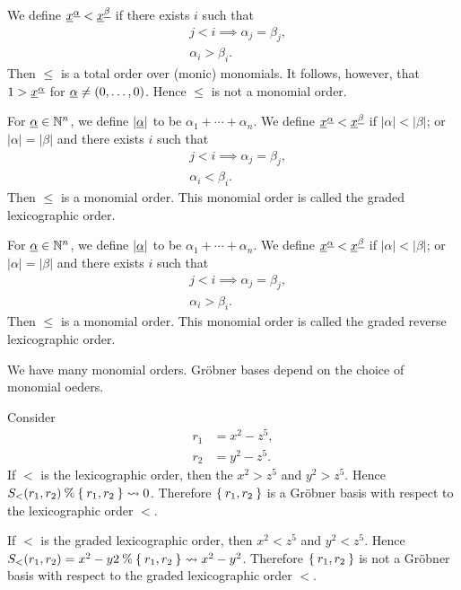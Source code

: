 \begin{nonexample}
  We define ${\underline{x}}^{\underline{\alpha}} < {\underline{x}}^{\underline{\beta}} $
  if there exists $i$ such that
  \begin{align*}
    &j<i\implies \alpha_j=\beta_j,\\
    &\alpha_i > \beta_i.
  \end{align*}
  Then $\leq$ is a total order over (monic) monomials.
  It follows, however, that
  $1> {\underline{x}}^{\underline{\alpha}}$
  for ${\underline{\alpha}}\neq (0,\ldots,0)$.
  Hence $\leq$ is not a monomial order.
\end{nonexample}


\begin{example}
  For ${\underline{\alpha}}\in\mathbb{N}^n$,
  we define $|{\underline{\alpha}}|$
  to be $\alpha_1+\cdots+\alpha_n$.
  We define ${\underline{x}}^{\underline{\alpha}} < {\underline{x}}^{\underline{\beta}} $
  if
  $|\alpha|<|\beta|$;
  or $|\alpha|=|\beta|$ and
  there exists $i$ such that
  \begin{align*}
    &j<i\implies \alpha_j=\beta_j,\\
    &\alpha_i < \beta_i.
  \end{align*}
  Then $\leq$ is a monomial order.
  This monomial order is called the graded lexicographic order.
\end{example}

\begin{example}
  For ${\underline{\alpha}}\in\mathbb{N}^n$,
  we define $|{\underline{\alpha}}|$
  to be $\alpha_1+\cdots+\alpha_n$.
  We define ${\underline{x}}^{\underline{\alpha}} < {\underline{x}}^{\underline{\beta}} $
  if
  $|\alpha|<|\beta|$;
  or $|\alpha|=|\beta|$ and
  there exists $i$ such that
  \begin{align*}
    &j<i\implies \alpha_j=\beta_j,\\
    &\alpha_i > \beta_i.
  \end{align*}
  Then $\leq$ is a monomial order.
  This monomial order is called the graded reverse lexicographic order.
\end{example}

We have many monomial orders.
Gr\"obner bases depend on the choice of monomial oeders.
\begin{example}
  Consider
  \begin{align*}
    r_1&=x^2-z^5,\\
    r_2&=y^2-z^5.
  \end{align*}
  If $<$ is the lexicographic order,
  then
  the $x^2>z^5$ and $y^2 > z^5$.
  Hence $S_<(r_1,r_2)\mathbin{\%} \Set{r_1,r_2}\leadsto 0$.
  Therefore $\Set{r_1,r_2}$ is a Gr\"obner basis
  with respect to the lexicographic order $<$.
  
  If $<$ is the graded lexicographic order,
  then
  $x^2<z^5$ and $y^2<z^5$.
  Hence $S_<(r_1,r_2)=x^2-y2\mathbin{\%} \Set{r_1,r_2}\leadsto x^2-y^2$.
  Therefore $\Set{r_1,r_2}$ is not a Gr\"obner basis
  with respect to the graded lexicographic order $<$.
\end{example}

